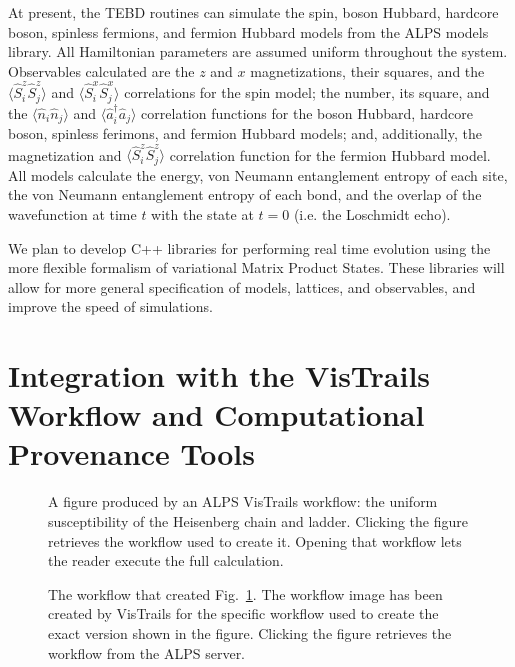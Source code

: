 \documentclass[12pt]{iopart}
\begin{document}
At present, the TEBD routines can simulate the spin, boson Hubbard, hardcore boson, spinless fermions, and fermion Hubbard models from the ALPS models library.  All 
Hamiltonian parameters are assumed uniform throughout the system.  Observables calculated are the $z$ and $x$ magnetizations, their squares, and the $\langle \hat{S}^z_i 
\hat{S}^z_j\rangle$ and $\langle \hat{S}^x_i \hat{S}^x_j\rangle$ correlations for the spin model; the number, its square, and the $\langle \hat{n}_i \hat{n}_j\rangle$ and 
$\langle \hat{a}_i^{\dagger} \hat{a}_j\rangle$ correlation functions for the boson Hubbard, hardcore boson, spinless ferimons, and fermion Hubbard models; and, additionally, 
the magnetization and $\langle \hat{S}^z_i \hat{S}^z_j\rangle$ correlation function for the fermion Hubbard model.  All models calculate the energy, von Neumann entanglement 
entropy of each site, the von Neumann entanglement entropy of each bond, and the overlap of the wavefunction at time $t$ with the state at $t=0$ (i.e. the Loschmidt echo).

We plan to develop C++ libraries for performing real time evolution using the more flexible formalism of variational Matrix Product States.  These libraries will allow for more general specification of models, lattices, and observables, and improve the speed of simulations. 


\section{Integration with the VisTrails Workflow and Computational Provenance Tools}
\begin{figure}
\begin{center}

\caption{A figure produced by an ALPS VisTrails workflow: the uniform susceptibility of the Heisenberg chain and ladder. Clicking the figure retrieves the workflow used to 
create it. Opening that workflow lets the reader execute the full calculation.}
\label{fig:figure}
\end{center}
\end{figure}


\begin{figure}
\begin{center}
\caption{The workflow that created Fig.~\ref{fig:figure}. The workflow image has been created by VisTrails for the specific workflow used to create the exact version shown in the figure. Clicking the figure retrieves the workflow from the ALPS server.}
\label{fig:workflow}
\end{center}
\end{figure}
\end{document}

